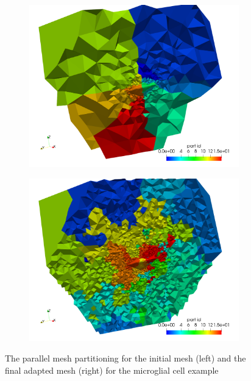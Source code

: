 \begin{figure}[ht!]
\centering
\begin{subfigure}{.5\textwidth}
\centering
\includegraphics[width=.99\linewidth]{img/aut_glial_initial_parts.png}
\end{subfigure}%
\begin{subfigure}{0.5\textwidth}
\centering
\includegraphics[width=.99\linewidth]{img/aut_glial_final_parts.png}
\end{subfigure}
\caption{The parallel mesh partitioning for the initial mesh (left)
and the final adapted mesh (right) for the microglial cell example}
\label{fig:aut_glial_parts}
\end{figure}

